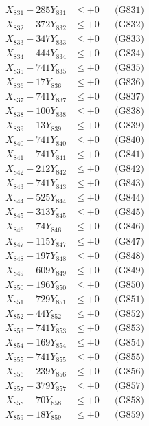 \documentclass[a4paper,10pt]{article}
\begin{document}
{\begin{align}
\allowbreak
X_{831} - 285Y_{831} &\leq +0 && \text{(G831)} \\
X_{832} - 372Y_{832} &\leq +0 && \text{(G832)} \\
X_{833} - 347Y_{833} &\leq +0 && \text{(G833)} \\
X_{834} - 444Y_{834} &\leq +0 && \text{(G834)} \\
X_{835} - 741Y_{835} &\leq +0 && \text{(G835)} \\
X_{836} - 17Y_{836} &\leq +0 && \text{(G836)} \\
X_{837} - 741Y_{837} &\leq +0 && \text{(G837)} \\
X_{838} - 100Y_{838} &\leq +0 && \text{(G838)} \\
X_{839} - 13Y_{839} &\leq +0 && \text{(G839)} \\
X_{840} - 741Y_{840} &\leq +0 && \text{(G840)} \\
\allowbreak
X_{841} - 741Y_{841} &\leq +0 && \text{(G841)} \\
X_{842} - 212Y_{842} &\leq +0 && \text{(G842)} \\
X_{843} - 741Y_{843} &\leq +0 && \text{(G843)} \\
X_{844} - 525Y_{844} &\leq +0 && \text{(G844)} \\
X_{845} - 313Y_{845} &\leq +0 && \text{(G845)} \\
X_{846} - 74Y_{846} &\leq +0 && \text{(G846)} \\
X_{847} - 115Y_{847} &\leq +0 && \text{(G847)} \\
X_{848} - 197Y_{848} &\leq +0 && \text{(G848)} \\
X_{849} - 609Y_{849} &\leq +0 && \text{(G849)} \\
X_{850} - 196Y_{850} &\leq +0 && \text{(G850)} \\
\allowbreak
X_{851} - 729Y_{851} &\leq +0 && \text{(G851)} \\
X_{852} - 44Y_{852} &\leq +0 && \text{(G852)} \\
X_{853} - 741Y_{853} &\leq +0 && \text{(G853)} \\
X_{854} - 169Y_{854} &\leq +0 && \text{(G854)} \\
X_{855} - 741Y_{855} &\leq +0 && \text{(G855)} \\
X_{856} - 239Y_{856} &\leq +0 && \text{(G856)} \\
X_{857} - 379Y_{857} &\leq +0 && \text{(G857)} \\
X_{858} - 70Y_{858} &\leq +0 && \text{(G858)} \\
X_{859} - 18Y_{859} &\leq +0 && \text{(G859)} \\

\end{align}}
\end{document}
